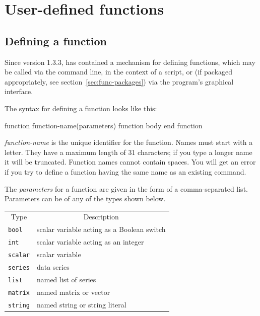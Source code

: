 \chapter{User-defined functions}
\label{chap:functions}

\section{Defining a function}
\label{func-define}

Since version 1.3.3,  has contained a mechanism for
defining functions, which may be called via the command line, in
the context of a script, or (if packaged appropriately, see
section~\ref{sec:func-packages}) via the program's graphical
interface.

The syntax for defining a function looks like this:
    
\begin{code}
function function-name(parameters)
   function body
end function
\end{code}

\textsl{function-name} is the unique identifier for the function.
Names must start with a letter. They have a maximum length of 31
characters; if you type a longer name it will be truncated.  Function
names cannot contain spaces.  You will get an error if you try to
define a function having the same name as an existing 
command.

The \textsl{parameters} for a function are given in the form of a
comma-separated list.  Parameters can be of any of the types shown
below.

\begin{center}
\begin{tabular}{ll}
\multicolumn{1}{c}{Type} & 
\multicolumn{1}{c}{Description} \\ [4pt]
\texttt{bool}   & scalar variable acting as a Boolean switch \\
\texttt{int}    & scalar variable acting as an integer  \\
\texttt{scalar} & scalar variable \\
\texttt{series} & data series \\
\texttt{list}   & named list of series \\
\texttt{matrix} & named matrix or vector \\
\texttt{string} & named string or string literal 
\end{tabular}
\end{center}

